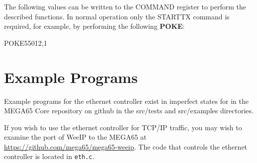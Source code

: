 The following values can be written to the COMMAND register to perform the described functions.
In normal operation only the STARTTX command is required, for example, by performing the following {\bf POKE}:

\begin{screencode}
POKE55012,1
\end{screencode}



\section{Example Programs}

Example programs for the ethernet controller exist in imperfect states for in the MEGA65 Core repository on github in the src/tests and src/examples directories.

If you wish to use the ethernet controller for TCP/IP traffic, you may wish to examine the port of WeeIP to the MEGA65 at
\url{https://github.com/mega65/mega65-weeip}.  The code that controls the ethernet controller is located in {\tt eth.c}.
